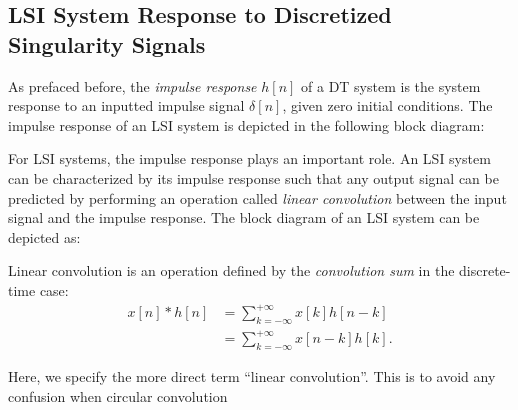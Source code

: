 \documentclass{report}
\begin{document}
\subsection{LSI System Response to Discretized Singularity Signals}
As prefaced before, the \emph{impulse response} $h[n]$ of a DT system is the system response to an inputted impulse signal $\delta[n]$, given zero initial conditions. 
The impulse response of an LSI system is depicted in the following block diagram:
\begin{center}
\end{center}
For LSI systems, the impulse response plays an important role. An LSI system can be characterized by its impulse response such that any output signal can be predicted by 
performing an operation called \emph{linear convolution} between the input signal and the impulse response. The block diagram of an LSI system can be depicted as:
\begin{center}
\end{center}
\begin{tcolorbox}[width=\textwidth,colback={white}, sharp corners]
    Linear convolution is an operation defined by the \emph{convolution sum} in the discrete-time case:
    \begin{align}
        x[n] * h[n] &= \sum_{k=-\infty}^{+\infty} x[k]h[n-k] \\
        &= \sum_{k=-\infty}^{+\infty} x[n-k]h[k].
    \end{align}
\end{tcolorbox}
Here, we specify the more direct term ``linear convolution''. This is to avoid any confusion when circular convolution 
\end{document}
